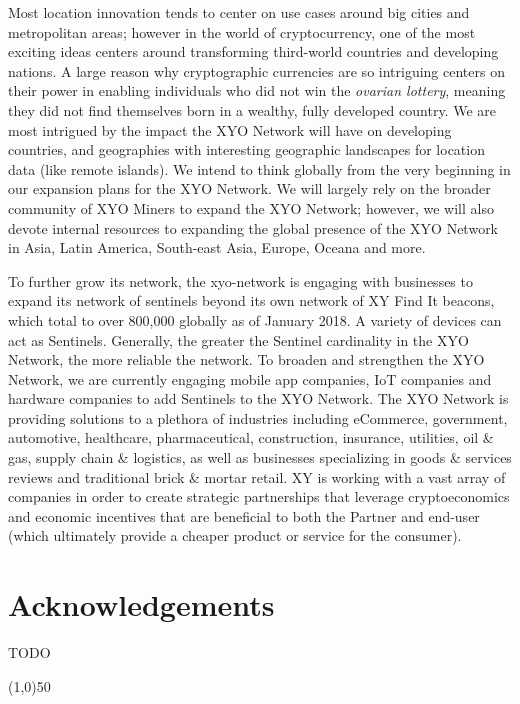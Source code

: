 \documentclass{article}
\begin{document}
Most location innovation tends to center on use cases around big cities and metropolitan areas; however in the world of cryptocurrency, one of the most exciting ideas centers around transforming third-world countries and developing nations. A large reason why cryptographic currencies are so intriguing centers on their power in enabling individuals who did not win the \textit{ovarian lottery}, meaning they did not find themselves born in a wealthy, fully developed country. We are most intrigued by the impact the XYO Network will have on developing countries, and geographies with interesting geographic landscapes for location data (like remote islands). We intend to think globally from the very beginning in our expansion plans for the XYO Network. We will largely rely on the broader community of XYO Miners to expand the XYO Network; however, we will also devote internal resources to expanding the global presence of the XYO Network in Asia, Latin America, South-east Asia, Europe, Oceana and more.

To further grow its network, the \Gls{xyo-network} is engaging with businesses to expand its network of \Glspl{sentinel} beyond its own network of XY Find It beacons, which total to over 800,000 globally as of January 2018. A variety of devices can act as Sentinels. Generally, the greater the Sentinel cardinality in the XYO Network, the more reliable the network. To broaden and strengthen the XYO Network, we are currently engaging mobile app companies, IoT companies and hardware companies to add Sentinels to the XYO Network. The XYO Network is providing solutions to a plethora of industries including eCommerce, government, automotive, healthcare, pharmaceutical, construction, insurance, utilities, oil \& gas, supply chain \& logistics, as well as businesses specializing in goods \& services reviews and traditional brick \& mortar retail. XY is working with a vast array of companies in order to create strategic partnerships that leverage \gls{cryptoeconomics} and economic incentives that are beneficial to both the Partner and end-user (which ultimately provide a cheaper product or service for the consumer).


\section {Acknowledgements}
TODO


\begin{center}
\line(1,0){50}
\end{center}
\end{document}
